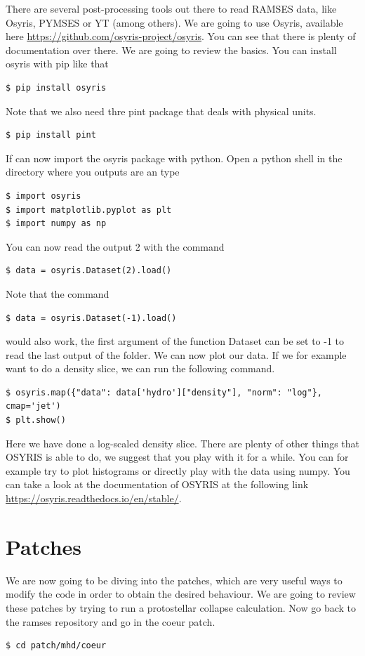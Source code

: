 \documentclass{article}
\begin{document}
There are several post-processing tools out there to read RAMSES data, like Osyris, PYMSES or YT (among others). 
We are going to use Osyris, available here \url{https://github.com/osyris-project/osyris}. You can see that there is plenty of documentation over there. We are going to review the basics. 
You can install osyris with pip like that 
\begin{lstlisting}[]
$ pip install osyris
\end{lstlisting}
Note that we also need thre pint package that deals with physical units. 
\begin{lstlisting}[]
$ pip install pint
\end{lstlisting}
If can now import the osyris package with python. Open a python shell in the directory where you outputs are an type
\begin{lstlisting}[]
$ import osyris
$ import matplotlib.pyplot as plt
$ import numpy as np
\end{lstlisting}
You can now read the output 2 with the command 
\begin{lstlisting}[]
$ data = osyris.Dataset(2).load()
\end{lstlisting}
Note that the command 
\begin{lstlisting}[]
$ data = osyris.Dataset(-1).load()
\end{lstlisting}
would also work, the first argument of the function Dataset can be set to -1 to read the last output of the folder. We can now plot our data. If we for example want to do a density slice, we can run the following command.
\begin{lstlisting}[]
$ osyris.map({"data": data['hydro']["density"], "norm": "log"}, cmap='jet')
$ plt.show()
\end{lstlisting}
Here we have done a log-scaled density slice. There are plenty of other things that OSYRIS is able to do, we suggest that you play with it for a while. You can for example try to plot histograms or directly play with the data using numpy. You can take a look at the documentation of OSYRIS at the following link \url{https://osyris.readthedocs.io/en/stable/}.

\section{Patches}

We are now going to be diving into the patches, which are very useful ways to modify the code in order to obtain the desired behaviour. We are going to review these patches by trying to run a protostellar collapse calculation. Now go back to the ramses repository and go in the coeur patch.
\begin{lstlisting}[]
$ cd patch/mhd/coeur
\end{lstlisting}
\end{document}

